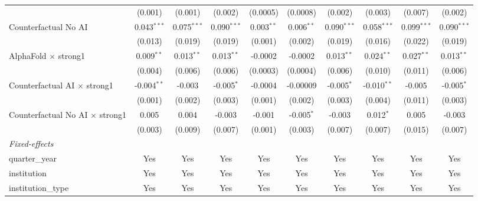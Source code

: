 \begin{tabular}{lccccccccc}
                                          & (0.001)       & (0.001)       & (0.002)       & (0.0005)     & (0.0008)     & (0.002)       & (0.003)       & (0.007)       & (0.002)\\   
   Counterfactual No AI                   & 0.043$^{***}$ & 0.075$^{***}$ & 0.090$^{***}$ & 0.003$^{**}$ & 0.006$^{**}$ & 0.090$^{***}$ & 0.058$^{***}$ & 0.099$^{***}$ & 0.090$^{***}$\\   
                                          & (0.013)       & (0.019)       & (0.019)       & (0.001)      & (0.002)      & (0.019)       & (0.016)       & (0.022)       & (0.019)\\   
   AlphaFold $\times$ strong1             & 0.009$^{**}$  & 0.013$^{**}$  & 0.013$^{**}$  & -0.0002      & -0.0002      & 0.013$^{**}$  & 0.024$^{**}$  & 0.027$^{**}$  & 0.013$^{**}$\\   
                                          & (0.004)       & (0.006)       & (0.006)       & (0.0003)     & (0.0004)     & (0.006)       & (0.010)       & (0.011)       & (0.006)\\   
   Counterfactual AI $\times$ strong1     & -0.004$^{**}$ & -0.003        & -0.005$^{*}$  & -0.0004      & -0.00009     & -0.005$^{*}$  & -0.010$^{**}$ & -0.005        & -0.005$^{*}$\\   
                                          & (0.001)       & (0.002)       & (0.003)       & (0.001)      & (0.002)      & (0.003)       & (0.004)       & (0.011)       & (0.003)\\   
   Counterfactual No AI $\times$ strong1  & 0.005         & 0.004         & -0.003        & -0.001       & -0.005$^{*}$ & -0.003        & 0.012$^{*}$   & 0.005         & -0.003\\   
                                          & (0.003)       & (0.009)       & (0.007)       & (0.001)      & (0.003)      & (0.007)       & (0.007)       & (0.015)       & (0.007)\\   
   \midrule
   \emph{Fixed-effects}\\
   quarter\_year                          & Yes           & Yes           & Yes           & Yes          & Yes          & Yes           & Yes           & Yes           & Yes\\  
   institution                            & Yes           & Yes           & Yes           & Yes          & Yes          & Yes           & Yes           & Yes           & Yes\\  
   institution\_type                      & Yes           & Yes           & Yes           & Yes          & Yes          & Yes           & Yes           & Yes           & Yes\\  

\end{tabular}
